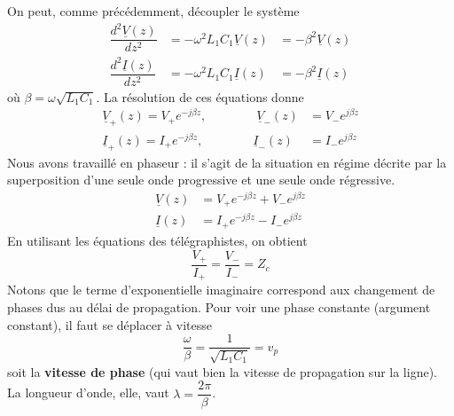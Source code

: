 	On peut, comme précédemment, découpler le système
	\begin{equation}
	\begin{aligned}
	\dfrac{d^2\underline{V}(z)}{dz^2} &= -\omega^2 L_1C_1\underline{V}(z) &= -\beta^2
	\underline{V}(z)\\
	\dfrac{d^2\underline{I}(z)}{dz^2} &= -\omega^2 L_1C_1\underline{I}(z) &= -\beta^2
	\underline{I}(z)	
	\end{aligned}
	\end{equation}
	où $\beta = \omega\sqrt{L_1C_1}$. La résolution de ces équations donne
	\begin{equation}
	\begin{array}{lll}
	\underline{V}_+(z) = V_+e^{-j\beta z},\qquad\qquad 	\underline{V}_-(z) &= V_-e^{j\beta z}\\
	\underline{I}_+(z) = I_+e^{-j\beta z},\qquad\qquad 	\underline{I}_-(z) &= I_-e^{j\beta z}	
	\end{array}
	\end{equation}
	Nous avons travaillé en phaseur : il s'agit de la situation en régime décrite par la 
	superposition d'une seule onde progressive et une seule onde régressive.
	\begin{equation}
	\begin{array}{ll}
	\underline{V}(z) &= V_+e^{-j\beta z}+V_-e^{j\beta z}\\
	\underline{I}(z) &= I_+e^{-j\beta z}-I_-e^{j\beta z}	
	\end{array}
	\end{equation}
	En utilisant les équations des télégraphistes, on obtient
	\begin{equation}
	\dfrac{V_+}{I_+} = \dfrac{V_-}{I_-} = Z_c
	\end{equation}
	Notons que le terme d'exponentielle imaginaire correspond aux changement de phases dus 
	au délai de propagation. Pour voir une phase constante (argument constant), il faut se 
	déplacer à vitesse
	\begin{equation}
	\dfrac{\omega}{\beta} = \dfrac{1}{\sqrt{L_1C_1}} = v_p
	\end{equation}
	soit la \textbf{vitesse de phase} (qui vaut bien la vitesse de propagation sur la ligne).
	La longueur d'onde, elle, vaut $\lambda = \dfrac{2\pi}{\beta}$.
	
	\newpage
